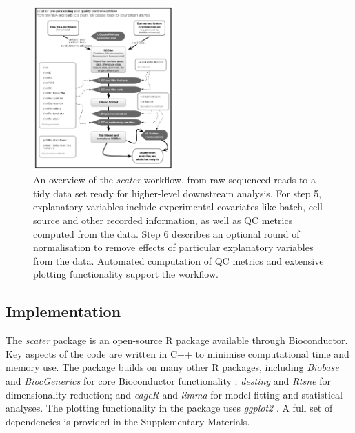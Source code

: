 \documentclass{bioinfo}
\begin{document}
\begin{methods}
\begin{figure}[!tpb]%
\centerline{\includegraphics[width=0.48\textwidth]{figures/scater_qc_workflow.pdf}}
\caption{An overview of the \emph{scater} workflow, from raw sequenced reads to a tidy data set ready for higher-level downstream analysis. For step 5, explanatory variables include experimental covariates like batch, cell source and other recorded information, as well as QC metrics computed from the data. Step 6 describes an optional round of normalisation to remove effects of particular explanatory variables from the data. Automated computation of QC metrics and extensive plotting functionality support the workflow.}\label{fig:01}
\end{figure}


\subsection{Implementation}\label{implementation}

The \emph{scater} package is an open-source R package available through     Bioconductor. Key aspects of the code are written in C++ to minimise computational time and memory use. The package builds on many other R packages, including \emph{Biobase} and \emph{BiocGenerics} for core Bioconductor functionality \citep{Huber2015-en}; \emph{destiny} \citep{Angerer2015-sw} and \emph{Rtsne} \citep{Krijthe2015-is} for dimensionality reduction; and \emph{edgeR} \citep{Robinson2010-ky} and \emph{limma} \citep{Ritchie2015-so} for model fitting and statistical analyses. The plotting functionality in the package uses \emph{ggplot2} \citep{Wickham2016-dc}. A full set of dependencies is provided in the Supplementary Materials.

\end{methods}
\end{document}
